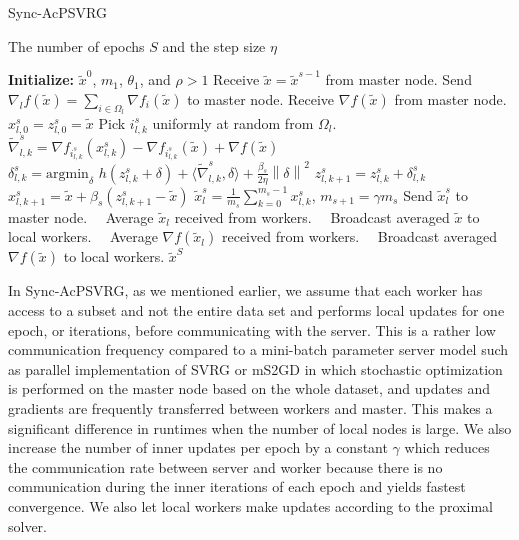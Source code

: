 \documentclass{article}
\newcommand{\norm}[1]{\left\lVert#1\right\rVert}
\renewcommand{\algorithmicrequire}{
\textbf{Input:}}
\renewcommand{\algorithmicensure}{\textbf{Output:}}
\theoremstyle{definition}
\theoremstyle{remark}
\begin{document}
\begin{algorithm}[H]
\caption{Sync-AcPSVRG}\label{SyncVR-Algo-Single}
\begin{algorithmic}
\renewcommand{\algorithmicrequire}{\textbf{Input:}}
 \renewcommand{\algorithmicensure}{\textbf{Output:}}
  \newcommand{\INITIALIZE}{\item[\textbf{Initialize:}]}
\REQUIRE The number of epochs $S$ and the step size $\eta$
\INITIALIZE $\widetilde{x}^0$, $m_1$, $\theta_1$, and $\rho > 1$
\STATE Receive $\widetilde{x} = \widetilde{x}^{s-1}$ from master node.
\STATE  Send $\nabla_l f(\widetilde{x}) = \sum_{i\in\Omega_l}\nabla f_i(\widetilde{x})$ to master node.
\STATE  Receive $\nabla f(\widetilde{x})$ from master node.
 \STATE $x_{l,0}^s = z_{l,0}^s = \widetilde{x}$
 \STATE Pick $i_{l,k}^s$ uniformly at random from $\Omega_l$.
 \STATE $\widetilde{\nabla}_{l,k}^s = \nabla f_{i_{l,k}^s}(x_{l,k}^s) - \nabla f_{i_{l,k}^s}(\widetilde{x}) + \nabla f(\widetilde{x})$
 \STATE $\delta_{l,k}^s = \text{argmin}_{\delta}\,\,h(z_{l,k}^s+\delta)+\langle\widetilde{\nabla}_{l,k}^s,\delta\rangle + \frac{{\beta_s}}{2\eta}\norm{\delta}^2$
 \STATE $z_{l,k+1}^s = z_{l,k}^s + \delta_{l,k}^s$
 \STATE $x_{l,k+1}^s = \widetilde{x}+\beta_s(z_{l,k+1}^s-\widetilde{x})$
 \ENDFOR
\STATE $\widetilde{x}_{l}^s = \frac{1}{m_s}\sum_{k=0}^{m_s-1} x_{l,k}^s$, $m_{s+1} = \gamma m_s$
\STATE Send $\widetilde{x}_{l}^s$ to master node.
 \ENDFOR
 \ENDFOR
 \STATE\qquad\,\,\,\, Average $\widetilde{x}_l$ received from workers.
  \STATE\qquad\,\,\,\, Broadcast averaged $\widetilde{x}$ to local workers.
  \STATE\qquad\,\,\,\, Average $\nabla f(\widetilde{x}_l)$ received from workers.
  \STATE\qquad\,\,\,\, Broadcast averaged $\nabla f(\widetilde{x})$ to local workers.
 \ENSURE $\widetilde{x}^S$
\end{algorithmic}
\end{algorithm}

In Sync-AcPSVRG, as we mentioned earlier, we assume that each worker has access to a subset and not the entire data set and performs local updates for one epoch, or iterations, before communicating with
the  server. This  is  a  rather  low  communication  frequency
compared  to  a mini-batch parameter  server  model such as parallel implementation of SVRG \cite{Zhao2014} or mS2GD \cite{Konecny2016} in which stochastic optimization is performed on the master node based on the whole dataset, and updates and gradients are frequently transferred between workers and master. This  makes  a  significant  difference  in  runtimes  when  the
number of local nodes is large.
 We also increase the number of inner updates per epoch by a constant $\gamma$ which reduces the communication rate between server and worker because there is no communication during the inner iterations of each epoch and yields fastest convergence. We also let local workers make updates according to the proximal solver.
\end{document}

